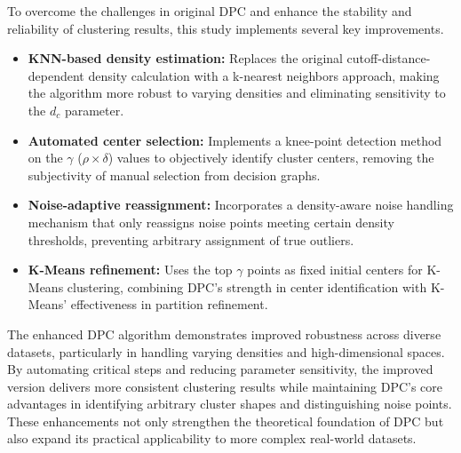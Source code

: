 \documentclass{article}
\begin{document}
To overcome the challenges in original DPC and enhance the stability and reliability of clustering results, this study implements several key improvements.
\begin{itemize}
\item \textbf{KNN-based density estimation:} Replaces the original cutoff-distance-dependent density calculation with a k-nearest neighbors approach, making the algorithm more robust to varying densities and eliminating sensitivity to the $d_{c}$ parameter.
\item \textbf{Automated center selection:} Implements a knee-point detection method on the $\gamma$ ($\rho \times \delta$) values to objectively identify cluster centers, removing the subjectivity of manual selection from decision graphs.
\item \textbf{Noise-adaptive reassignment:} Incorporates a density-aware noise handling mechanism that only reassigns noise points meeting certain density thresholds, preventing arbitrary assignment of true outliers.
\item \textbf{K-Means refinement:} Uses the top $\gamma$ points as fixed initial centers for K-Means clustering, combining DPC's strength in center identification with K-Means' effectiveness in partition refinement.
\end{itemize}

The enhanced DPC algorithm demonstrates improved robustness across diverse datasets, particularly in handling varying densities and high-dimensional spaces. By automating critical steps and reducing parameter sensitivity, the improved version delivers more consistent clustering results while maintaining DPC's core advantages in identifying arbitrary cluster shapes and distinguishing noise points. These enhancements not only strengthen the theoretical foundation of DPC but also expand its practical applicability to more complex real-world datasets.
\end{document}
